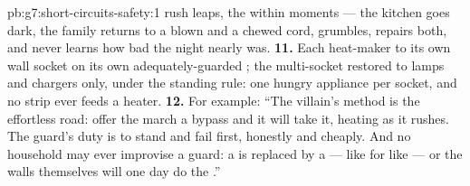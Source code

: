 \begin{solution}{pb:g7:short-circuits-safety:1}
rush leaps, the   within moments --- the kitchen goes
dark, the family returns to a blown  and a chewed cord,
grumbles, repairs both, and never learns how bad the night
nearly was.
\textbf{11.} Each heat-maker to its own wall socket on its own
adequately-guarded ; the multi-socket restored to lamps
and chargers only, under the standing rule: one hungry appliance
per socket, and no strip ever feeds a heater.
\textbf{12.} For example: ``The villain's method is the
effortless road: offer the march a bypass and it will take it,
heating as it rushes. The guard's duty is to stand  and
fail first, honestly and cheaply. And no household may ever
improvise a guard: a  is replaced by a  --- like for
like --- or the walls themselves will one day do the .''
\end{solution}
